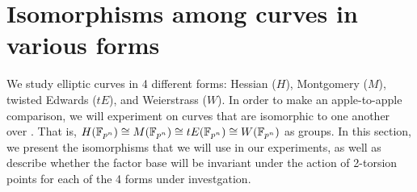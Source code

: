 %
%

\section{Isomorphisms among curves in various forms}
\label{sec:isomorphisms}

We study elliptic curves in 4 different forms: Hessian ($H$),
Montgomery ($M$), twisted Edwards ($tE$), and Weierstrass ($W$).
%
In order to make an apple-to-apple comparison, we will experiment on
curves that are isomorphic to one another over .
%
That is, $H(\mathbb F_{p^n})\cong M(\mathbb F_{p^n})\cong tE(\mathbb F_{p^n})\cong W(\mathbb F_{p^n})$
as groups.
%
In this section, we present the isomorphisms that we will use in our
experiments, as well as describe whether the factor base will be
invariant under the action of 2-torsion points for each of the 4 forms
under investgation.

